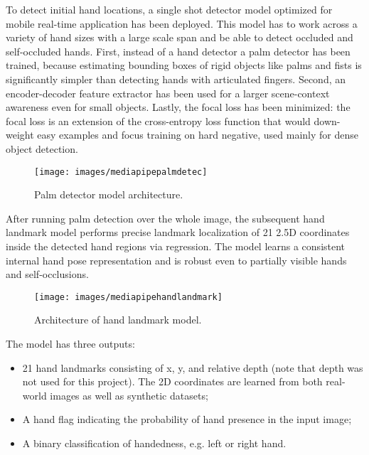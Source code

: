 \noindent To detect initial hand locations, a single shot detector model optimized for mobile real-time application has been deployed. This model has to work across a variety of hand sizes with a large scale span and be able to detect occluded and self-occluded hands. First, instead of a hand detector a palm detector has been trained, because estimating bounding boxes of rigid objects like palms and fists is significantly simpler than detecting hands with articulated fingers. Second, an encoder-decoder feature extractor has been used  for a larger scene-context awareness even for small objects. Lastly, the focal loss has been minimized: the focal loss is an extension of the cross-entropy loss function that would down-weight easy examples and focus training on hard negative, used mainly for dense object detection.

\begin{figure}[H]
	\centering
	\texttt{[image: images/mediapipepalmdetec]}
	\caption[Palm detector model architecture.]{Palm detector model architecture.}
	\label{fig:mediapipepalmdetec}
\end{figure}

\noindent After running palm detection over the whole image, the subsequent hand landmark model performs precise landmark localization of 21 2.5D coordinates inside the detected hand regions via regression. The model learns a consistent internal hand pose representation and is robust even to partially visible hands and self-occlusions.

\begin{figure}[H]
	\centering
	\texttt{[image: images/mediapipehandlandmark]}
	\caption[Architecture of hand landmark model..]{Architecture of hand landmark model.}
	\label{fig:mediapipehandlandmark}
\end{figure}

\noindent The model has three outputs: 

\begin{itemize}
  \item 21 hand landmarks consisting of x, y, and relative depth (note that depth was not used for this project). The 2D coordinates are learned from both real-world images as well as synthetic datasets;
  \item A hand flag indicating the probability of hand presence in the input image;
  \item A binary classification of handedness, e.g. left or right hand.
\end{itemize}

